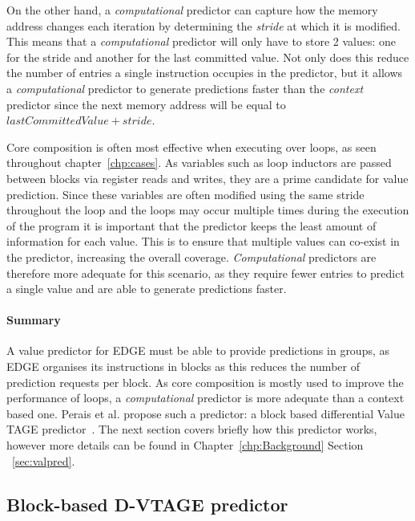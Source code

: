 On the other hand, a \textit{computational} predictor can capture how the memory address changes each iteration by determining the \textit{stride} at which it is modified.
This means that a \textit{computational} predictor will only have to store 2 values: one for the stride and another for the last committed value.
Not only does this reduce the number of entries a single instruction occupies in the predictor, but it allows a \textit{computational} predictor to generate predictions faster than the \textit{context} predictor since the next memory address will be equal to $ lastCommittedValue + stride$.

Core composition is often most effective when executing over loops, as seen throughout chapter~\ref{chp:cases}.
As variables such as loop inductors are passed between blocks via register reads and writes, they are a prime candidate for value prediction.
Since these variables are often modified using the same stride throughout the loop and the loops may occur multiple times during the execution of the program it is important that the predictor keeps the least amount of information for each value.
This is to ensure that multiple values can co-exist in the predictor, increasing the overall coverage.
\textit{Computational} predictors are therefore more adequate for this scenario, as they require fewer entries to predict a single value and are able to generate predictions faster.


\paragraph*{Summary}

A value predictor for EDGE must be able to provide predictions in groups, as EDGE organises its instructions in blocks as this reduces the number of prediction requests per block.
As core composition is mostly used to improve the performance of loops, a \textit{computational} predictor is more adequate than a context based one.
Perais et al. propose such a predictor: a block based differential Value TAGE predictor~\cite{peraisBeBop2015}.
The next section covers briefly how this predictor works, however more details can be found in Chapter~\ref{chp:Background} Section ~\ref{sec:valpred}.

\subsection{Block-based D-VTAGE predictor}

